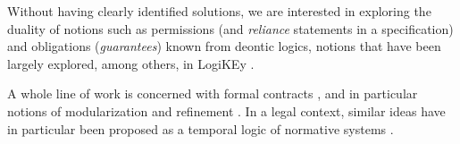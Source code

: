 Without having clearly identified solutions, we are interested in exploring
the duality of notions such as permissions (and \emph{reliance} statements in
a specification) and obligations (\emph{guarantees}) known from deontic
logics, notions that have been largely explored, among others, in LogiKEy
\cite{benzmueller_etal_logikey_2020}. 

A whole line of work is concerned with formal contracts
\cite{benveniste_raclet_etal_ContractsMonograph2018}, and in particular
notions of modularization and refinement
\cite{Alfaro2005,grumberg_lang_model_checking_modular_verification_2004}. In a
legal context, similar ideas have in particular been proposed as a temporal
logic of normative systems
\cite{agotnes_hoek_aguilar_sierra_woolridge_temporal_logic_normative_systems_2009}. 

